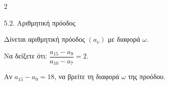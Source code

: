 \begin{ylh}{2}
    \item 5.2. Αριθμητική πρόοδος
\end{ylh}
Δίνεται αριθμητική πρόοδος $(a_\nu)$ με διαφορά $\omega$.
\begin{alist}
\item Να δείξετε ότι: $\dfrac{a_{15} - a_9}{a_{10} - a_7} = 2$. 
\item Αν $a_{15} - a_9 = 18$, να βρείτε τη διαφορά $\omega$ της προόδου. 
\end{alist}

